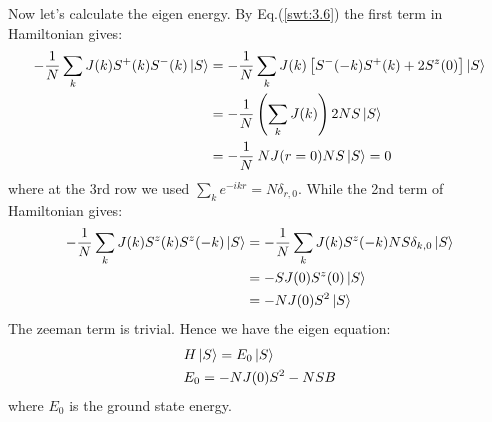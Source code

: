 \documentclass[11pt]{article}
\theoremstyle{remark}
\theoremstyle{definition}
\numberwithin{thm}{section}
\numberwithin{equation}{section}
\begin{document}
Now let's calculate the eigen energy. By Eq.(\ref{swt:3.6}) the first term in Hamiltonian gives:
\begin{equation}
	\begin{split}
		- \frac{1}{N} \sum_{k}J(k)S^+(k)S^-(k)\ket{S} &= -\frac{1}{N}\sum_{k} J(k)\left[S^-(-k)S^+(k) + 2 S^z(0)\right] \ket{S}\\
							     &= -\frac{1}{N}\left(\sum_{k}J(k)\right) 2NS \ket{S}\\
							     &= -\frac{1}{N}\:NJ(r=0) NS\ket{S} = 0
	\end{split}
\end{equation}
where at the 3rd row we used $\sum_{k}e^{-ikr} = N\delta_{r,0} $. While the 2nd term of Hamiltonian gives:
\begin{equation}
	\begin{split}
		-\frac{1}{N}\sum_{k}J(k)S^z(k)S^z(-k)\ket{S} &= -\frac{1}{N} \sum_{k}J(k)S^z(-k)NS\delta_{k,0}\ket{S} \\
							     &= - S J(0)S^z(0)\ket{S}\\
							     &= -NJ(0)S^2\ket{S}
	\end{split}
\end{equation}
The zeeman term is trivial. Hence we have the eigen equation:
\begin{equation}
	\begin{split}
		&H\ket{S} = E_0 \ket{S}\\
		&E_0 = -NJ(0)S^2 - NSB
	\end{split}
\end{equation}
where $E_0$ is the ground state energy. 
\end{document}
